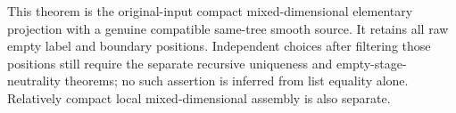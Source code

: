 \begin{remark}
This theorem is the original-input compact mixed-dimensional
elementary projection with a genuine compatible same-tree smooth
source. It retains all raw empty label and boundary positions.
Independent choices after filtering those positions still require
the separate recursive uniqueness and empty-stage-neutrality
theorems; no such assertion is inferred from list equality alone.
Relatively compact local mixed-dimensional assembly is also separate.
\end{remark}
